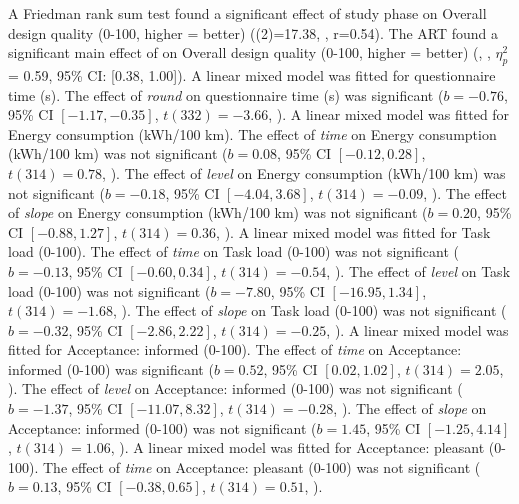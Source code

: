 A Friedman rank sum test found a significant effect of study phase on Overall design quality (0-100, higher = better) (\chisq(2)=17.38, , r=0.54).
The ART found a significant main effect of \Phase on Overall design quality (0-100, higher = better) (, , $\eta_{p}^{2}$ = 0.59, 95\% CI: [0.38, 1.00]).
A linear mixed model was fitted for questionnaire time (s).
The effect of \textit{round} on questionnaire time (s) was significant ($b = -0.76$, 95\% CI $[-1.17, -0.35]$, $t(332) = -3.66$, ).
A linear mixed model was fitted for Energy consumption (kWh/100 km).
The effect of \textit{time} on Energy consumption (kWh/100 km) was not significant ($b = 0.08$, 95\% CI $[-0.12, 0.28]$, $t(314) = 0.78$, ).
The effect of \textit{level} on Energy consumption (kWh/100 km) was not significant ($b = -0.18$, 95\% CI $[-4.04, 3.68]$, $t(314) = -0.09$, ).
The effect of \textit{slope} on Energy consumption (kWh/100 km) was not significant ($b = 0.20$, 95\% CI $[-0.88, 1.27]$, $t(314) = 0.36$, ).
A linear mixed model was fitted for Task load (0-100).
The effect of \textit{time} on Task load (0-100) was not significant ($b = -0.13$, 95\% CI $[-0.60, 0.34]$, $t(314) = -0.54$, ).
The effect of \textit{level} on Task load (0-100) was not significant ($b = -7.80$, 95\% CI $[-16.95, 1.34]$, $t(314) = -1.68$, ).
The effect of \textit{slope} on Task load (0-100) was not significant ($b = -0.32$, 95\% CI $[-2.86, 2.22]$, $t(314) = -0.25$, ).
A linear mixed model was fitted for Acceptance: informed (0-100).
The effect of \textit{time} on Acceptance: informed (0-100) was significant ($b = 0.52$, 95\% CI $[0.02, 1.02]$, $t(314) = 2.05$, ).
The effect of \textit{level} on Acceptance: informed (0-100) was not significant ($b = -1.37$, 95\% CI $[-11.07, 8.32]$, $t(314) = -0.28$, ).
The effect of \textit{slope} on Acceptance: informed (0-100) was not significant ($b = 1.45$, 95\% CI $[-1.25, 4.14]$, $t(314) = 1.06$, ).
A linear mixed model was fitted for Acceptance: pleasant (0-100).
The effect of \textit{time} on Acceptance: pleasant (0-100) was not significant ($b = 0.13$, 95\% CI $[-0.38, 0.65]$, $t(314) = 0.51$, ).
